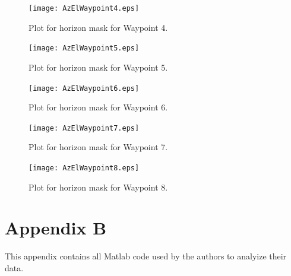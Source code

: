 \documentclass[]{aiaa-tc}%
\begin{document}
	\begin{figure}[H]
		\centering
		\texttt{[image: AzElWaypoint4.eps]}
		\caption{Plot for horizon mask for Waypoint 4.}
		\label{fig:AzElWaypoint4}
	\end{figure}
	
	\begin{figure}[H]
		\centering
		\texttt{[image: AzElWaypoint5.eps]}
		\caption{Plot for horizon mask for Waypoint 5.}
		\label{fig:AzElWaypoint5}
	\end{figure}
	
	\begin{figure}[H]
		\centering
		\texttt{[image: AzElWaypoint6.eps]}
		\caption{Plot for horizon mask for Waypoint 6.}
		\label{fig:AzElWaypoint6}
	\end{figure}
	
	\begin{figure}[H]
		\centering
		\texttt{[image: AzElWaypoint7.eps]}
		\caption{Plot for horizon mask for Waypoint 7.}
		\label{fig:AzElWaypoint7}
	\end{figure}
	
	\begin{figure}[H]
		\centering
		\texttt{[image: AzElWaypoint8.eps]}
		\caption{Plot for horizon mask for Waypoint 8.}
		\label{fig:AzElWaypoint8}
	\end{figure}
	
    \section{Appendix B}
This appendix contains all Matlab code used by the authors to analyize their data.
    
    
%    
%    
%    

\vspace{5mm}

\vspace{5mm}

\vspace{5mm}

\vspace{5mm}
	
\end{document}
